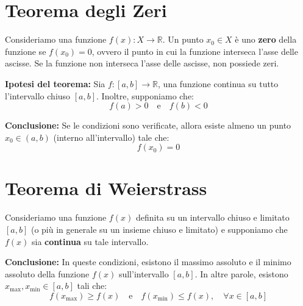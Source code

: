 \documentclass[12pt]{article}
\begin{document}
\Huge

\section*{Teorema degli Zeri}

Consideriamo una funzione \( f(x): X \to \mathbb{R} \).  
Un punto \( x_0 \in X \) è uno \textbf{zero} della funzione se \( f(x_0) = 0 \), ovvero il punto in cui la funzione interseca l'asse delle ascisse.  
Se la funzione non interseca l'asse delle ascisse, non possiede zeri.  

\vspace{0.5cm}

\textbf{Ipotesi del teorema:}  
Sia \( f: [a, b] \to \mathbb{R} \), una funzione continua su tutto l'intervallo chiuso \([a, b]\).  
Inoltre, supponiamo che:  
\[
f(a) > 0 \quad \text{e} \quad f(b) < 0
\]

\vspace{0.5cm}

\textbf{Conclusione:}  
Se le condizioni sono verificate, allora esiste almeno un punto \( x_0 \in (a, b) \) (interno all'intervallo) tale che:  
\[
f(x_0) = 0
\]

\vspace{1cm}

\section*{Teorema di Weierstrass}

Consideriamo una funzione \( f(x) \) definita su un intervallo chiuso e limitato \([a, b]\) (o più in generale su un insieme chiuso e limitato) e supponiamo che \( f(x) \) sia \textbf{continua} su tale intervallo.  

\vspace{0.5cm}

\textbf{Conclusione:}  
In queste condizioni, esistono il massimo assoluto e il minimo assoluto della funzione \( f(x) \) sull'intervallo \([a, b]\).  
In altre parole, esistono \( x_{\text{max}}, x_{\text{min}} \in [a, b] \) tali che:  
\[
f(x_{\text{max}}) \geq f(x) \quad \text{e} \quad f(x_{\text{min}}) \leq f(x), \quad \forall x \in [a, b]
\]
\end{document}
